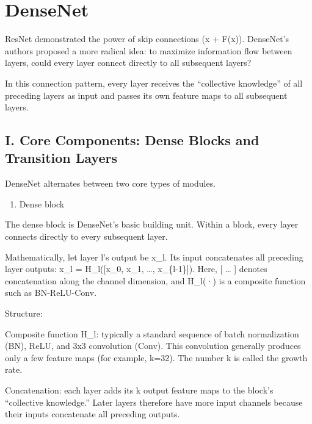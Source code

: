 \setcounter{section}{4}

\hypertarget{densenet}{%
\section{DenseNet}\label{densenet}}

ResNet demonstrated the power of skip connections (x + F(x)). DenseNet's authors proposed a more radical idea: to maximize information flow between layers, could every layer connect directly to all subsequent layers?

In this connection pattern, every layer receives the ``collective knowledge'' of all preceding layers as input and passes its own feature maps to all subsequent layers.

\hypertarget{i.-core-components-dense-blocks-and-transition-layers}{%
\subsection{I. Core Components: Dense Blocks and Transition Layers}\label{i.-core-components-dense-blocks-and-transition-layers}}

DenseNet alternates between two core types of modules.

\begin{enumerate}
\def\labelenumi{\arabic{enumi}.}
\tightlist
\item
  Dense block
\end{enumerate}

The dense block is DenseNet's basic building unit. Within a block, every layer connects directly to every subsequent layer.

Mathematically, let layer l's output be x\_l. Its input concatenates all preceding layer outputs: x\_l = H\_l({[}x\_0, x\_1, \ldots, x\_\{l-1\}{]}).
Here, {[} \ldots{} {]} denotes concatenation along the channel dimension, and H\_l(·) is a composite function such as BN-ReLU-Conv.

Structure:

Composite function H\_l: typically a standard sequence of batch normalization (BN), ReLU, and 3x3 convolution (Conv). This convolution generally produces only a few feature maps (for example, k=32). The number k is called the growth rate.

Concatenation: each layer adds its k output feature maps to the block's ``collective knowledge.'' Later layers therefore have more input channels because their inputs concatenate all preceding outputs.

